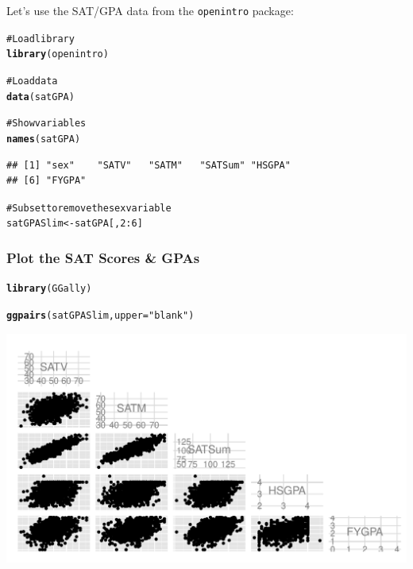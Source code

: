 \documentclass{beamer}\usepackage{graphicx, color}
\makeatletter
\def\maxwidth{ %
  \ifdim\Gin@nat@width>\linewidth
    \linewidth
  \else
    \Gin@nat@width
  \fi
}
\newcommand{\hlfunctioncall}[1]{\textcolor[rgb]{0.501960784313725,0,0.329411764705882}{\textbf{#1}}}%
\newcommand{\hlstring}[1]{\textcolor[rgb]{0.6,0.6,1}{#1}}%
\newcommand{\hlcomment}[1]{\textcolor[rgb]{0.180392156862745,0.6,0.341176470588235}{#1}}%
\newenvironment{kframe}{%
 \def\at@end@of@kframe{}%
 \ifinner\ifhmode%
  \def\at@end@of@kframe{\end{minipage}}%
  \begin{minipage}{\columnwidth}%
 \fi\fi%
 \def\FrameCommand##1{\hskip\@totalleftmargin \hskip-\fboxsep
 \colorbox{shadecolor}{##1}\hskip-\fboxsep
     \hskip-\linewidth \hskip-\@totalleftmargin \hskip\columnwidth}%
 \MakeFramed {\advance\hsize-\width
   \@totalleftmargin\z@ \linewidth\hsize
   \@setminipage}}%
 {\par\unskip\endMakeFramed%
 \at@end@of@kframe}
\newenvironment{knitrout}{}{} %
\makeatother
\begin{document}
\begin{frame}[fragile]
  Let's use the SAT/GPA data from the \texttt{openintro} package:
\begin{knitrout}
\color{fgcolor}\begin{kframe}
\begin{alltt}
\hlcomment{# Load library}
\hlfunctioncall{library}(openintro)

\hlcomment{# Load data}
\hlfunctioncall{data}(satGPA)

\hlcomment{# Show variables}
\hlfunctioncall{names}(satGPA)
\end{alltt}
\begin{verbatim}
## [1] "sex"    "SATV"   "SATM"   "SATSum" "HSGPA" 
## [6] "FYGPA"
\end{verbatim}
\begin{alltt}

\hlcomment{# Subset to remove the sex variable}
satGPASlim <- satGPA[, 2:6]
\end{alltt}
\end{kframe}
\end{knitrout}

\end{frame}

\begin{frame}[fragile]
  \frametitle{Plot the SAT Scores \& GPAs}
\begin{knitrout}
\color{fgcolor}\begin{kframe}
\begin{alltt}
\hlfunctioncall{library}(GGally)

\hlfunctioncall{ggpairs}(satGPASlim, upper = \hlstring{"blank"})
\end{alltt}
\end{kframe}

{\centering \includegraphics[width=\maxwidth]{figure/DescribeGPA} 

}


\end{knitrout}

\end{frame}
\end{document}
